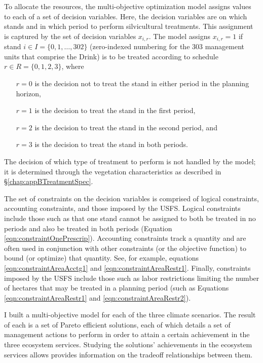 To allocate the resources, the multi-objective optimization model assigns values to each of a set of decision variables. Here, the decision variables are on which stands and in which period to perform silvicultural treatments. This assignment is captured by the set of decision variables $x_{i,r}$. The model assigns $x_{i,r} = 1$ if stand $i \in I = \{0,1,\ldots,302\}$ (zero-indexed numbering for the 303 management units that comprise the Drink) is to be treated according to schedule $r \in R = \{0,1,2,3\}$, where
\begin{itemize}
\item[$r = 0$] is the decision not to treat the stand in either period in the planning horizon,\item[$r = 1$] is the decision to treat the stand in the first period,
\item[$r = 2$] is the decision to treat the stand in the second period, and
\item[$r = 3$] is the decision to treat the stand in both periods.
\end{itemize}
The decision of which type of treatment to perform is not handled by the model; it is determined through the vegetation characteristics as described in \S \ref{chap:appBTreatmentSpec}.

The set of constraints on the decision variables is comprised of logical constraints, accounting constraints, and those imposed by the USFS. Logical constraints include those such as that one stand cannot be assigned to both be treated in no periods and also be treated in both periods (Equation \ref{eqn:constraintOnePrescrip}). Accounting constraints track a quantity and are often used in conjunction with other constraints (or the objective function) to bound (or optimize) that quantity. See, for example, equations \ref{eqn:constraintAreaAcctg1} and \ref{eqn:constraintAreaRestr1}. Finally, constraints imposed by the USFS include those such as labor restrictions limiting the number of hectares that may be treated in a planning period (such as Equations \ref{eqn:constraintAreaRestr1} and \ref{eqn:constraintAreaRestr2}).

I built a multi-objective model for each of the three climate scenarios. The result of each is a set of Pareto efficient solutions, each of which details a set of management actions to perform in order to attain a certain achievement in the three ecosystem services. Studying the solutions' achievements in the ecosystem services allows provides information on the tradeoff relationships between them.

